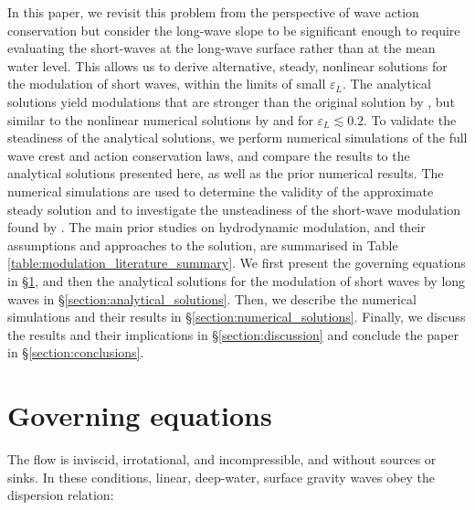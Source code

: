 \documentclass[lineno]{jfm}
\begin{document}
In this paper, we revisit this problem from the perspective of wave action
conservation but consider the long-wave slope to be significant enough to
require evaluating the short-waves at the long-wave surface rather than at the
mean water level.
This allows us to derive alternative, steady, nonlinear solutions for the
modulation of short waves, within the limits of small $\varepsilon_L$.
The analytical solutions yield modulations that are stronger than the original
solution by \citet{longuet1960changes}, but similar to the nonlinear numerical
solutions by \citet{longuet1987propagation} and \citet{zhang1990evolution} for
$\varepsilon_L \lesssim 0.2$.
To validate the steadiness of the analytical solutions, we perform numerical
simulations of the full wave crest and action conservation laws, and compare
the results to the analytical solutions presented here, as well as the prior
numerical results.
The numerical simulations are used to determine the validity of the approximate
steady solution and to investigate the unsteadiness of the short-wave modulation
found by \citet{peureux2021unsteady}.
The main prior studies on hydrodynamic modulation, and their assumptions and
approaches to the solution, are summarised in Table
\ref{table:modulation_literature_summary}.
We first present the governing equations in \S\ref{section:governing_equations},
and then the analytical solutions for the modulation of short waves by long waves
in \S\ref{section:analytical_solutions}.
Then, we describe the numerical simulations and their results in
\S\ref{section:numerical_solutions}.
Finally, we discuss the results and their implications in
\S\ref{section:discussion} and conclude the paper in \S\ref{section:conclusions}.

\section{Governing equations}
\label{section:governing_equations}

The flow is inviscid, irrotational, and incompressible, and without sources or
sinks.
In these conditions, linear, deep-water, surface gravity waves obey the
dispersion relation:
\end{document}
